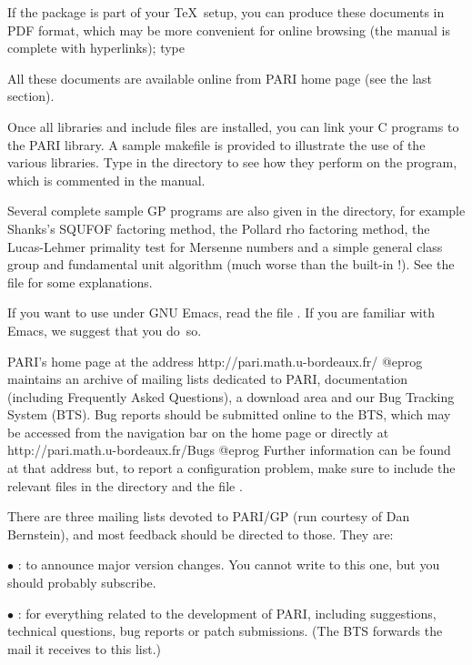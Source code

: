\noindent If the  package is part of your \TeX\ setup, you can
produce these documents in PDF format, which may be more convenient for
online browsing (the manual is complete with hyperlinks); type


\noindent All these documents are available online from PARI home page
(see the last section).

 Once all libraries and include files are installed,
you can link your C programs to the PARI library. A sample makefile
 is provided to illustrate the use of the various
libraries. Type  in the  directory to see how
they perform on the  program, which is commented in the
manual.

 Several complete sample GP programs are also given in
the  directory, for example Shanks's SQUFOF factoring method,
the Pollard rho factoring method, the Lucas-Lehmer primality test for
Mersenne numbers and a simple general class group and fundamental unit
algorithm (much worse than the built-in !). See the file
 for some explanations.

 If you want to use  under GNU Emacs, read the file
. If you are familiar with Emacs, we suggest that
you do~so.

 PARI's home page at the address
\bprog
  http://pari.math.u-bordeaux.fr/
@eprog\noindent
maintains an archive of mailing lists dedicated to PARI, documentation
(including Frequently Asked Questions), a download area and our Bug Tracking
System (BTS). Bug reports should be submitted online to the BTS, which may be
accessed from the navigation bar on the home page or directly at
\bprog
  http://pari.math.u-bordeaux.fr/Bugs
@eprog\noindent
Further information can be found at that address but, to report a
configuration problem, make sure to include the relevant  files in
the  directory and the file .
\smallskip

There are three mailing lists devoted to PARI/GP (run courtesy of Dan
Bernstein), and most feedback should be directed to those. They are:

$\bullet$ : to announce major version changes.
You cannot write to this one, but you should probably subscribe.

$\bullet$ : for everything related to the development
of PARI, including suggestions, technical questions, bug reports or patch
submissions. (The BTS forwards the mail it receives to this list.)

